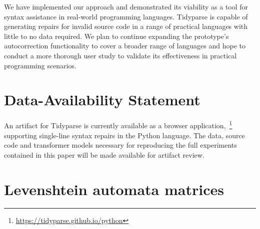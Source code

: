 \documentclass[sigplan,review,acmsmall,nonacm,screen,anonymous]{acmart}\settopmatter{printfolios=false,printccs=false,printacmref=false}
\begin{document}


We have implemented our approach and demonstrated its viability as a tool for syntax assistance in real-world programming languages. Tidyparse is capable of generating repairs for invalid source code in a range of practical languages with little to no data required. We plan to continue expanding the prototype's autocorrection functionality to cover a broader range of languages and hope to conduct a more thorough user study to validate its effectiveness in practical programming scenarios.

\section*{Data-Availability Statement}

An artifact for Tidyparse is currently available as a browser application,~\footnote{\url{https://tidyparse.github.io/python}} supporting single-line syntax repairs in the Python language. The data, source code and transformer models necessary for reproducing the full experiments contained in this paper will be made available for artifact review.

\clearpage

\pagebreak\appendix

\section{Levenshtein automata matrices}
\end{document}
